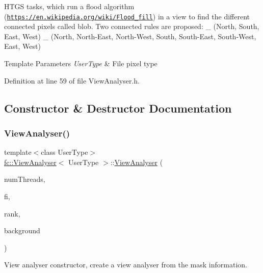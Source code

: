 H\+T\+GS tasks, which run a flood algorithm (\href{https://en.wikipedia.org/wiki/Flood_fill}{\tt https\+://en.\+wikipedia.\+org/wiki/\+Flood\+\_\+fill}) in a view to find the different connected pixels called blob. Two connected rules are proposed\+: \+\_ (North, South, East, West) \+\_ (North, North-\/\+East, North-\/\+West, South, South-\/\+East, South-\/\+West, East, West)


\begin{DoxyTemplParams}{Template Parameters}
{\em User\+Type} & File pixel type \\
\hline
\end{DoxyTemplParams}


Definition at line 59 of file View\+Analyser.\+h.



\subsection{Constructor \& Destructor Documentation}
\mbox{\label{classfc_1_1ViewAnalyser_a9bede8677246172230ddb1b70362d8a4}} 
\subsubsection{\texorpdfstring{View\+Analyser()}{ViewAnalyser()}}
{\footnotesize\ttfamily template$<$class User\+Type$>$ \\
\hyperlink{classfc_1_1ViewAnalyser}{fc\+::\+View\+Analyser}$<$ User\+Type $>$\+::\hyperlink{classfc_1_1ViewAnalyser}{View\+Analyser} (\begin{DoxyParamCaption}\item[{size\+\_\+t}]{num\+Threads,  }\item[{\hyperlink{classfi_1_1FastImage}{fi\+::\+Fast\+Image}$<$ User\+Type $>$ $\ast$}]{fi,  }\item[{const uint8\+\_\+t \&}]{rank,  }\item[{const User\+Type \&}]{background }\end{DoxyParamCaption})\hspace{0.3cm}{\ttfamily [inline]}}



View analyser constructor, create a view analyser from the mask information. 



